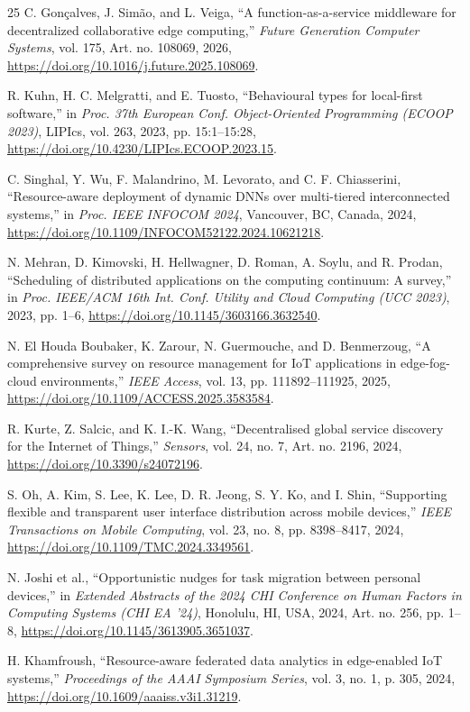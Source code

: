 \documentclass[10pt,twocolumn]{article}
\newcommand{\doi}[1]{\url{https://doi.org/#1}}
\begin{document}
\begin{thebibliography}{25}
 C. Gon\c{c}alves, J. Sim\~{a}o, and L. Veiga, ``A function-as-a-service middleware for decentralized collaborative edge computing,'' \emph{Future Generation Computer Systems}, vol. 175, Art. no. 108069, 2026, \doi{10.1016/j.future.2025.108069}.
	
 R. Kuhn, H. C. Melgratti, and E. Tuosto, ``Behavioural types for local-first software,'' in \emph{Proc. 37th European Conf. Object-Oriented Programming (ECOOP 2023)}, LIPIcs, vol. 263, 2023, pp. 15:1--15:28, \doi{10.4230/LIPIcs.ECOOP.2023.15}.
	
 C. Singhal, Y. Wu, F. Malandrino, M. Levorato, and C. F. Chiasserini, ``Resource-aware deployment of dynamic DNNs over multi-tiered interconnected systems,'' in \emph{Proc. IEEE INFOCOM 2024}, Vancouver, BC, Canada, 2024, \doi{10.1109/INFOCOM52122.2024.10621218}.
	
 N. Mehran, D. Kimovski, H. Hellwagner, D. Roman, A. Soylu, and R. Prodan, ``Scheduling of distributed applications on the computing continuum: A survey,'' in \emph{Proc. IEEE/ACM 16th Int. Conf. Utility and Cloud Computing (UCC 2023)}, 2023, pp. 1--6, \doi{10.1145/3603166.3632540}.
	
 N. El Houda Boubaker, K. Zarour, N. Guermouche, and D. Benmerzoug, ``A comprehensive survey on resource management for IoT applications in edge-fog-cloud environments,'' \emph{IEEE Access}, vol. 13, pp. 111892--111925, 2025, \doi{10.1109/ACCESS.2025.3583584}.
	
 R. Kurte, Z. Salcic, and K. I.-K. Wang, ``Decentralised global service discovery for the Internet of Things,'' \emph{Sensors}, vol. 24, no. 7, Art. no. 2196, 2024, \doi{10.3390/s24072196}.
	
 S. Oh, A. Kim, S. Lee, K. Lee, D. R. Jeong, S. Y. Ko, and I. Shin, ``Supporting flexible and transparent user interface distribution across mobile devices,'' \emph{IEEE Transactions on Mobile Computing}, vol. 23, no. 8, pp. 8398--8417, 2024, \doi{10.1109/TMC.2024.3349561}.
	
 N. Joshi et al., ``Opportunistic nudges for task migration between personal devices,'' in \emph{Extended Abstracts of the 2024 CHI Conference on Human Factors in Computing Systems (CHI EA '24)}, Honolulu, HI, USA, 2024, Art. no. 256, pp. 1--8, \doi{10.1145/3613905.3651037}.
	
 H. Khamfroush, ``Resource-aware federated data analytics in edge-enabled IoT systems,'' \emph{Proceedings of the AAAI Symposium Series}, vol. 3, no. 1, p. 305, 2024, \doi{10.1609/aaaiss.v3i1.31219}.
	

\end{thebibliography}
\end{document}
